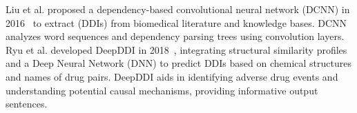 \documentclass[unnumsec,webpdf,contemporary,large]{oup-authoring-template}%
\theoremstyle{thmstyleone}%
\theoremstyle{thmstyletwo}%
\theoremstyle{thmstylethree}%
\begin{document}
Liu et al. proposed a dependency-based convolutional neural network (DCNN) in 2016~\cite{shengyu2016} to extract (DDIs) from biomedical literature and knowledge bases. DCNN analyzes word sequences and dependency parsing trees using convolution layers. Ryu et al. developed DeepDDI in 2018~\cite{Ryu2018}, integrating structural similarity profiles and a Deep Neural Network (DNN) to predict DDIs based on chemical structures and names of drug pairs. DeepDDI aids in identifying adverse drug events and understanding potential causal mechanisms, providing informative output sentences.
\end{document}

